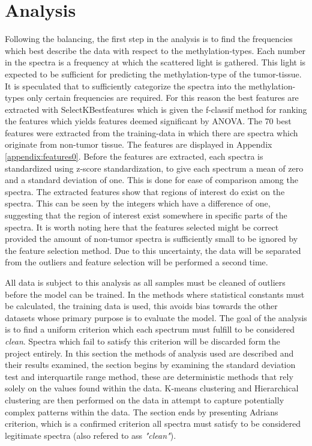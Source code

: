 \section{Analysis}

Following the balancing, the first step in the analysis is to find the frequencies which best describe the data with respect to the methylation-types. Each number in the spectra is a frequency at which the scattered light is gathered. This light is expected to be sufficient for predicting the methylation-type of the tumor-tissue. It is speculated that to sufficiently categorize the spectra into the methylation-types only certain frequencies are required. For this reason the best features are extracted with SelectKBestfeatures \cite{scikit} which is given the f-classif method for ranking the features which yields features deemed significant by ANOVA. The 70 best features were extracted from the training-data in which there are spectra which originate from non-tumor tissue. The features are displayed in Appendix \ref{appendix:features0}. Before the features are extracted, each spectra is standardized using z-score standardization, to give each spectrum a mean of zero and a standard deviation of one. This is done for ease of comparison among the spectra. The extracted features show that regions of interest do exist on the spectra. This can be seen by the integers which have a difference of one, suggesting that the region of interest exist somewhere in specific parts of the spectra. It is worth noting here that the features selected might be correct provided the amount of non-tumor spectra is sufficiently small to be ignored by the feature selection method. Due to this uncertainty, the data will be separated from the outliers and feature selection will be performed a second time.

All data is subject to this analysis as all samples must be cleaned of outliers before the model can be trained. In the methods where statistical constants must be calculated, the training data is used, this avoids bias towards the other datasets whose primary purpose is to evaluate the model. The goal of the analysis is to find a uniform criterion which each spectrum must fulfill to be considered \textit{clean}. Spectra which fail to satisfy this criterion will be discarded form the project entirely. In this section the methods of analysis used are described and their results examined, the section begins by examining the standard deviation test and interquartile range method, these are deterministic methods that rely solely on the values found within the data. K-means clustering and Hierarchical clustering are then performed on the data in attempt to capture potentially complex patterns within the data. The section ends by presenting Adrians criterion, which is a confirmed criterion all spectra must satisfy to be considered legitimate spectra (also refered to ass \textit{"clean"}).

